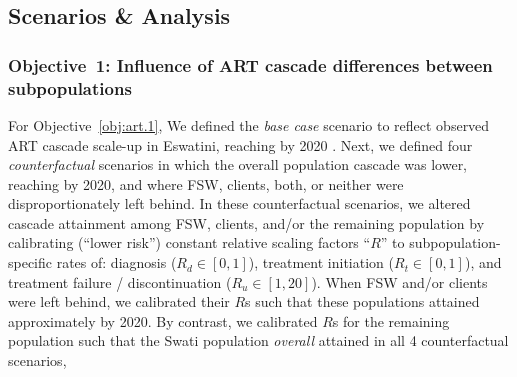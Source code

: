 \subsection{Scenarios \& Analysis}\label{art.meth.obj}
\subsubsection{Objective~1: Influence of ART cascade differences between subpopulations}\label{art.meth.obj.1}
For Objective~\ref{obj:art.1},
We defined the \emph{base case} scenario to reflect
observed ART cascade scale-up in Eswatini, reaching \cashi by 2020 \cite{SHIMS3,AIDSinfo}.
Next, we defined four \emph{counterfactual} scenarios in which
the overall population cascade was lower, reaching \casmd by 2020,
and where FSW, clients, both, or neither were disproportionately left behind.
In these counterfactual scenarios, we altered cascade attainment among
FSW, clients, and/or the remaining population by calibrating (``lower risk'')
constant relative scaling factors ``$R$'' to subpopulation-specific rates of:
diagnosis ($R_d \in [0,1]$),
treatment initiation ($R_t \in [0,1]$), and
treatment failure / discontinuation ($R_u \in [1,20]$).
When FSW and/or clients were left behind, we calibrated their $R$s such that
these populations attained approximately \caslo by 2020.
By contrast, we calibrated $R$s for the remaining population such that
the Swati population \emph{overall} attained \casmd in all 4 counterfactual scenarios,
